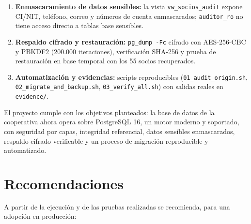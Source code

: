 \begin{enumerate}
        \texttt{hostssl}, autenticación \texttt{scram-sha-256}, revocación de
        \texttt{PUBLIC}, 7 roles con mínimo privilegio
        (\texttt{admin\_dba}, \texttt{app\_core\_rw}, \texttt{auditor\_ro},
        \texttt{migration\_loader} y 4 roles de administradores del equipo),
        registro de conexiones, desconexiones y DDL.
  \item \textbf{Enmascaramiento de datos sensibles:} la vista
        \texttt{vw\_socios\_audit} expone CI/NIT, teléfono, correo y números de
        cuenta enmascarados; \texttt{auditor\_ro} no tiene acceso directo a
        tablas base sensibles.
  \item \textbf{Respaldo cifrado y restauración:} \texttt{pg\_dump -Fc} cifrado
        con AES-256-CBC y PBKDF2 (200.000 iteraciones), verificación SHA-256 y
        prueba de restauración en base temporal con los 55 socios recuperados.
  \item \textbf{Automatización y evidencias:} scripts reproducibles
        (\texttt{01\_audit\_origin.sh}, \texttt{02\_migrate\_and\_backup.sh},
        \texttt{03\_verify\_all.sh}) con salidas reales en \texttt{evidence/}.
\end{enumerate}

El proyecto cumple con los objetivos planteados: la base de datos de la
cooperativa ahora opera sobre PostgreSQL 16, un motor moderno y soportado, con
seguridad por capas, integridad referencial, datos sensibles enmascarados,
respaldo cifrado verificable y un proceso de migración reproducible y
automatizado.

\section{Recomendaciones}

A partir de la ejecución y de las pruebas realizadas se recomienda, para una
adopción en producción:

